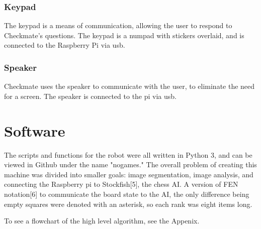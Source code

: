 \documentclass[onecolumn]{IEEEtran}
\begin{document}
\subsubsection{Keypad}
The keypad is a means of communication, allowing the user to respond to Checkmate's questions. The keypad is a numpad with stickers overlaid, and is connected to the Raspberry Pi via usb. 
\subsubsection{Speaker}
Checkmate uses the speaker to communicate with the user, to eliminate the need for a screen. The speaker is connected to the pi via usb. 

\section{Software}
The scripts and functions for the robot were all written in Python 3, and can be viewed in Github under the name "nogames." The overall problem of creating this machine was divided into smaller goals: image segmentation, image analysis, and connecting the Raspberry pi to Stockfish[5], the chess AI. A version of FEN notation[6] to communicate the board state to the AI, the only difference being empty squares were denoted with an asterisk, so each rank was eight items long.\par
To see a flowchart of the high level algorithm, see the Appenix.
\end{document}

